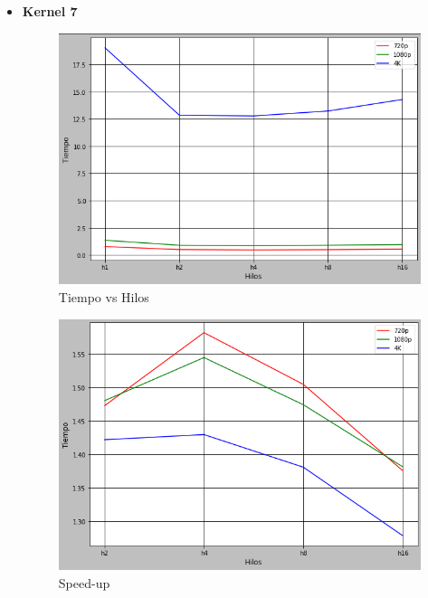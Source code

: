 \documentclass[a4paper,10pt]{IEEEtran}
\begin{document}
\begin{itemize}
    \item \textbf{Kernel 7} 
        \begin{figure}[H]
            \centering
            \includegraphics[scale = 0.3]{images/k7.png}
            \caption{Tiempo vs Hilos}
            \label{f02}
        \end{figure}{}
        
        \begin{figure}[H]
            \centering
            \includegraphics[scale = 0.3]{images/k7s.png}
            \caption{Speed-up}
            \label{f02a}
        \end{figure}{}
        

\end{itemize}
\end{document}
